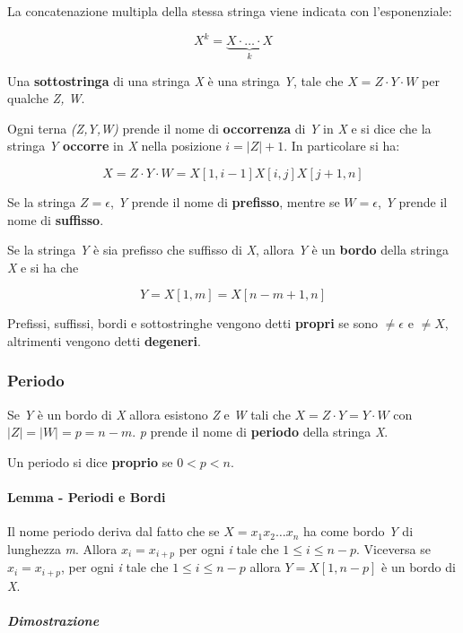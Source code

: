 La concatenazione multipla della stessa stringa viene indicata con
l'esponenziale:

$$
X^k = \underbrace{X \cdot \ldots \cdot X}_{k}
$$

Una \textbf{sottostringa} di una stringa \emph{X} è una stringa
\emph{Y}, tale che
$X = Z \cdot Y \cdot W$ per
qualche \emph{Z, W}.

Ogni terna \emph{(Z,Y,W)} prende il nome di \textbf{occorrenza} di
\emph{Y} in \emph{X} e si dice che la stringa \emph{Y} \textbf{occorre}
in \emph{X} nella posizione $i = |Z| + 1$.
In particolare si ha:

$$
X = Z \cdot Y \cdot W = X[1,i-1]X[i,j]X[j+1,n]
$$

Se la stringa $Z = \epsilon$, \emph{Y} prende il nome di
\textbf{prefisso}, mentre se $W=\epsilon$, \emph{Y} prende il nome
di \textbf{suffisso}.

Se la stringa \emph{Y} è sia prefisso che suffisso di \emph{X}, allora
\emph{Y} è un \textbf{bordo} della stringa \emph{X} e si ha che

$$
Y = X[1,m] = X[n-m+1,n]
$$

Prefissi, suffissi, bordi e sottostringhe vengono detti \textbf{propri}
se sono $\neq \epsilon$ e $\neq X$, altrimenti vengono detti
\textbf{degeneri}.

\subsubsection{Periodo}\label{periodo}

Se \emph{Y} è un bordo di \emph{X} allora esistono \emph{Z} e \emph{W}
tali che $X = Z \cdot Y = Y \cdot W$ con
$|Z| =|W| = p = n - m$.
\emph{p} prende il nome di \textbf{periodo} della stringa \emph{X}.

Un periodo si dice \textbf{proprio} se $0 < p <n$.

\paragraph{Lemma - Periodi e Bordi}\label{lemma---origine-del-periodo}

Il nome periodo deriva dal fatto che se $X = x_1x_2\ldots x_n$ ha
come bordo \emph{Y} di lunghezza \emph{m}. Allora $x_i = x_{i+p}$ per
ogni \emph{i} tale che $1 \leq i \leq n-p$. 
Viceversa se $x_i = x_{i+p}$, per ogni \emph{i} tale che $1 \leq i \leq n - p$ allora
$Y = X[1,n-p]$ è un bordo di \emph{X}.

\subparagraph{Dimostrazione}\label{dimostrazione}

